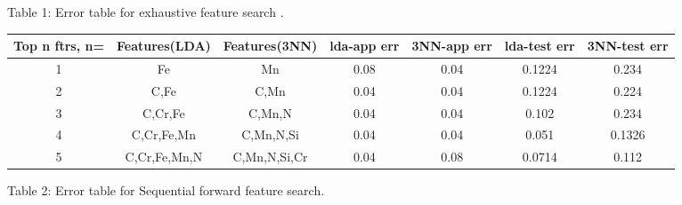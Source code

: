 \documentclass[paper=a4, fontsize=11pt]{scrartcl} %
\begin{document}
\hspace{4 cm} Table 1: Error table for exhaustive feature search .
\newline \newline
\begin{center}
 \begin{adjustwidth}{-1.5cm}{}
\small
\begin{tabular}{c c c c c c c}
\textbf{Top n ftrs, n=} \cellcolor{red!35} & \textbf{Features(LDA)} \cellcolor{red!35} & \textbf{Features(3NN)} \cellcolor{red!35} & \textbf{lda-app err} \cellcolor{red!35} & \textbf{3NN-app err} \cellcolor{red!35}& \textbf{lda-test err} \cellcolor{red!35}& \textbf{3NN-test err} \cellcolor{red!35} \\ [0.5cm]\hline \hline

1 \cellcolor{yellow!35} & Fe \cellcolor{yellow!35}& Mn \cellcolor{yellow!35} & 0.08 \cellcolor{yellow!35} & 0.04 \cellcolor{yellow!35}& 0.1224 \cellcolor{yellow!35}& 0.234 \cellcolor{yellow!35} \\ [0.5cm]

2 \cellcolor{green!50} & C,Fe \cellcolor{green!50} & C,Mn \cellcolor{green!50}& 0.04 \cellcolor{green!50} & 0.04 \cellcolor{green!50}& 0.1224 \cellcolor{green!50}& 0.224 \cellcolor{green!50} \\ [0.5cm]

3 \cellcolor{yellow!35} & C,Cr,Fe \cellcolor{yellow!35} & C,Mn,N \cellcolor{yellow!35} & 0.04 \cellcolor{yellow!35} & 0.04 \cellcolor{yellow!35}& 0.102 \cellcolor{yellow!35}& 0.234 \cellcolor{yellow!35} \\ [0.5cm]

4 \cellcolor{green!50} & C,Cr,Fe,Mn \cellcolor{green!50} & C,Mn,N,Si \cellcolor{green!50}& 0.04 \cellcolor{green!50} & 0.04 \cellcolor{green!50}& 0.051 \cellcolor{green!50}& 0.1326 \cellcolor{green!50} \\ [0.5cm]

5 \cellcolor{yellow!35} & C,Cr,Fe,Mn,N \cellcolor{yellow!35} & C,Mn,N,Si,Cr \cellcolor{yellow!35} & 0.04 \cellcolor{yellow!35} & 0.08 \cellcolor{yellow!35}& 0.0714 \cellcolor{yellow!35}& 0.112 \cellcolor{yellow!35} \\ [0.5cm]




\end{tabular}
\end{adjustwidth}
\end{center}
\hspace{4 cm} Table 2: Error table for Sequential forward feature search.
\newline \newline
\end{document}
